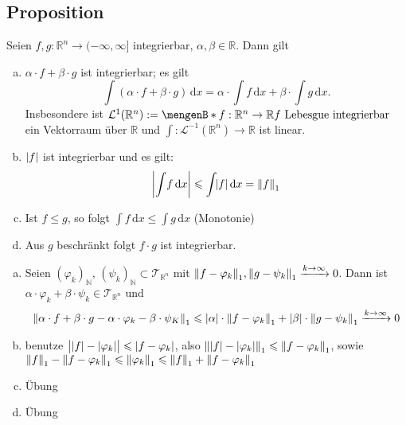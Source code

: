 \subsection[Proposition: Linearität und andere Eigenschaften des Lebesgue-Integrals]{Proposition} %
\label{sub:43}
Seien $f,g : \mathds{R}^n \to (-\infty, \infty]$ integrierbar, $\alpha, \beta \in \mathds{R}$. Dann gilt
\begin{enumerate}[a)]
	\item $\alpha \cdot f + \beta \cdot g$ ist integrierbar; es gilt 
	\[
		\int\! (\alpha \cdot f + \beta \cdot g)  \, \mathrm{d}x  = \alpha \cdot \int\! f  \, \mathrm{d}x + \beta \cdot \int\! g  \, \mathrm{d}x. 
	\]
	Insbesondere ist $\mathcal{L}^{1}(\mathds{R}^n) := \set[f : \mathds{R}^n \to \mathds{R}]{f \text{ Lebesgue integrierbar}} $ ein Vektorraum über $\mathds{R}$ und
	$\int : \mathcal{L}^{-1}(\mathds{R}^n) \to \mathds{R}$ ist linear.
	\item $\abs*{f}$ ist integrierbar und es gilt:
	\[
		\abs*{\int\! f  \, \mathrm{d}x } \le \int\! \abs*{f}  \, \mathrm{d}x   = \norm[1]{f} 
	\]
	\item Ist $f \le g$, so folgt $\int\! f  \, \mathrm{d}x  \le \int\! g  \, \mathrm{d}x $ \hfill(Monotonie)
	\item Aus $g$ beschränkt folgt $f \cdot g$ ist integrierbar.
\end{enumerate}
\begin{enumerate}[a)]
	\item Seien $(\varphi_k)_\mathds{N}$, $(\psi_k)_\mathds{N} \subset \mathcal{T}_{\mathds{R}^n}$ mit 
	$\norm[1]{f- \varphi_k}, \norm[1]{g - \psi_k} \xrightarrow{k \to \infty} 0  $. Dann ist $\alpha \cdot \varphi_k + \beta \cdot \psi_k \in \mathcal{T}_{\mathds{R}^n}$
	und 
	\begin{align*}
		\norm[1]{\alpha \cdot f + \beta \cdot g - \alpha \cdot \varphi_k - \beta \cdot \psi_K}  \le \abs*{\alpha} \cdot \norm[1]{f- \varphi_k} + \abs*{\beta} \cdot \norm[1]{g- \psi_k} \xrightarrow{k \to \infty} 0    
	\end{align*}
	\item benutze $\big| \abs*{f}- \abs*{\varphi_k} \big|   \le \abs*{f- \varphi_k} $, also $\norm[1]{\abs*{f}- \abs*{\varphi_k}} \le \norm[1]{f- \varphi_k}$, sowie 
	$\norm[1]{f} - \norm[1]{f- \varphi_k} \le \norm[1]{\varphi_k} \le \norm[1]{f} + \norm[1]{f- \varphi_k}$
	\item Übung
	\item Übung \bewende
\end{enumerate}

